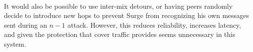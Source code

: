 \documentclass{paper}
\begin{document}
\paragraph{} It would also be possible to use inter-mix detours\cite{TODO}, or having peers randomly decide to introduce new hops to prevent Surge from recognizing his own messages sent during an $n - 1$ attack. However, this reduces reliability, increases latency, and given the protection that cover traffic provides seems unnecessary in this system. 



\end{document}
